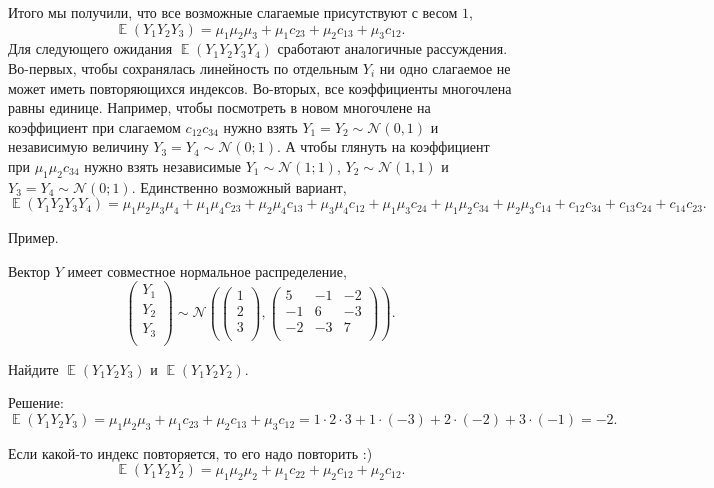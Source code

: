 \documentclass[12pt]{article}
\DeclareMathOperator{\E}{\mathbb{E}}
\newcommand{\cN}{\mathcal{N}}
\begin{document}
Итого мы получили, что все возможные слагаемые присутствуют с весом $1$,
\[
    \E(Y_1 Y_2 Y_3) = \mu_1 \mu_2 \mu_3 + \mu_1 c_{23} + \mu_2 c_{13} + \mu_3 c_{12}.
\]
Для следующего ожидания $\E(Y_1 Y_2 Y_3 Y_4)$ сработают аналогичные рассуждения. 
Во-первых, чтобы сохранялась линейность по отдельным $Y_i$ ни одно слагаемое не может иметь повторяющихся индексов.
Во-вторых, все коэффициенты многочлена равны единице. 
Например, чтобы посмотреть в новом многочлене на коэффициент при слагаемом $c_{12}c_{34}$ нужно взять $Y_1 = Y_2 \sim \cN(0, 1)$ 
и независимую величину $Y_3 = Y_4 \sim \cN(0;1)$. 
А чтобы глянуть на коэффициент при $\mu_1 \mu_2 c_{34}$ нужно взять независимые $Y_1 \sim \cN(1;1)$, $Y_2 \sim \cN(1,1)$ и 
 $Y_3 = Y_4 \sim \cN(0;1)$. 
Единственно возможный вариант,
\[
    \E(Y_1 Y_2 Y_3 Y_4) = \mu_1 \mu_2\mu_3 \mu_4 + \mu_1 \mu_4 c_{23} + \mu_2 \mu_4 c_{13} + \mu_3 \mu_4 c_{12} + \mu_1 \mu_3 c_{24} + \mu_1 \mu_2 c_{34} + \mu_2 \mu_3 c_{14} +  c_{12}c_{34} + c_{13}c_{24} + c_{14}c_{23}.
\]



Пример.

Вектор $Y$ имеет совместное нормальное распределение,
\[
\begin{pmatrix}
    Y_1 \\
    Y_2 \\
    Y_3 \\
\end{pmatrix} \sim \cN\left(
\begin{pmatrix}
    1 \\
    2 \\
    3 \\
\end{pmatrix},
\begin{pmatrix}
    5 & -1 & -2 \\
    -1 & 6 & -3 \\
    -2 & -3 & 7 \\
\end{pmatrix}
\right).
\]

Найдите $\E(Y_1 Y_2 Y_3)$ и $\E(Y_1 Y_2 Y_2)$.


Решение:
\[
    \E(Y_1 Y_2 Y_3)  = \mu_1 \mu_2\mu_3 + \mu_1 c_{23} + \mu_2 c_{13} + \mu_3 c_{12} = 1\cdot 2 \cdot 3 + 1 \cdot (-3) + 2 \cdot (-2) + 3\cdot (-1) = -2.
\]

Если какой-то индекс повторяется, то его надо повторить :)
\[
    \E(Y_1 Y_2 Y_2) = \mu_1 \mu_2\mu_2 + \mu_1 c_{22} + \mu_2 c_{12} + \mu_2 c_{12}.
\]
\end{document}
